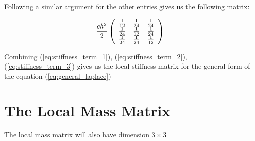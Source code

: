 Following a similar argument for the other entries gives us the following
matrix:

\begin{equation}\label{eq:stiffness_term_3}
    \frac{ch^2}{2}\left(\begin{array}{c c c}
         \frac{1}{12} &  \frac{1}{24} &  \frac{1}{24} \\
         \frac{1}{24} &  \frac{1}{12} &  \frac{1}{24} \\
         \frac{1}{24} &  \frac{1}{24} &  \frac{1}{12}
    \end{array}\right)
\end{equation}

Combining (\ref{eq:stiffness_term_1}), (\ref{eq:stiffness_term_2}),
(\ref{eq:stiffness_term_3}) gives us the local stiffness matrix for the general
form of the equation (\ref{eq:general_laplace})

\section{The Local Mass Matrix}

The local mass matrix will also have dimension $3 \times 3$
